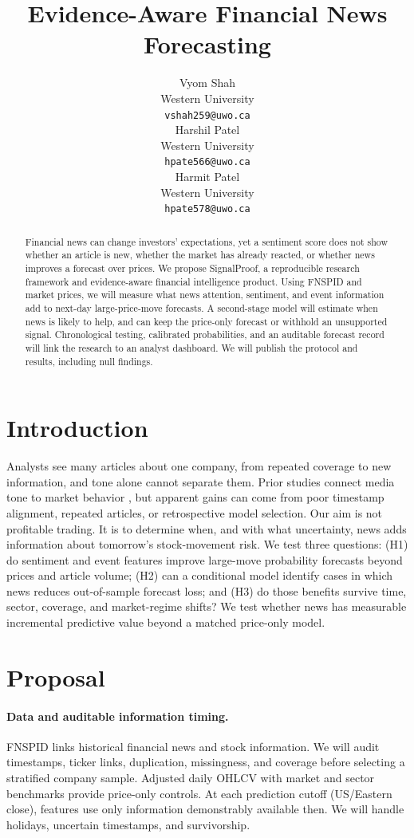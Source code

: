 \documentclass{article}
\title{Evidence-Aware Financial News Forecasting}
\author{%
  Vyom Shah \\
  Western University \\
  \texttt{vshah259@uwo.ca} \\
  \And
  Harshil Patel \\
  Western University \\
  \texttt{hpate566@uwo.ca} \\
  \And
  Harmit Patel \\
  Western University \\
  \texttt{hpate578@uwo.ca} \\
}
\begin{document}
\maketitle

\begin{abstract}
Financial news can change investors' expectations, yet a sentiment score does not show whether an article is new, whether the market has already reacted, or whether news improves a forecast over prices. We propose SignalProof, a reproducible research framework and evidence-aware financial intelligence product. Using FNSPID and market prices, we will measure what news attention, sentiment, and event information add to next-day large-price-move forecasts. A second-stage model will estimate when news is likely to help, and can keep the price-only forecast or withhold an unsupported signal. Chronological testing, calibrated probabilities, and an auditable forecast record will link the research to an analyst dashboard. We will publish the protocol and results, including null findings.
\end{abstract}

\section{Introduction}
Analysts see many articles about one company, from repeated coverage to new information, and tone alone cannot separate them. Prior studies connect media tone to market behavior \citep{tetlock2007}, but apparent gains can come from poor timestamp alignment, repeated articles, or retrospective model selection. Our aim is not profitable trading. It is to determine when, and with what uncertainty, news adds information about tomorrow's stock-movement risk. We test three questions: (H1) do sentiment and event features improve large-move probability forecasts beyond prices and article volume; (H2) can a conditional model identify cases in which news reduces out-of-sample forecast loss; and (H3) do those benefits survive time, sector, coverage, and market-regime shifts? We test whether news has measurable incremental predictive value beyond a matched price-only model.

\section{Proposal}
\paragraph{Data and auditable information timing.} FNSPID \citep{dong2024} links historical financial news and stock information. We will audit timestamps, ticker links, duplication, missingness, and coverage before selecting a stratified company sample. Adjusted daily OHLCV with market and sector benchmarks provide price-only controls. At each prediction cutoff (US/Eastern close), features use only information demonstrably available then. We will handle holidays, uncertain timestamps, and survivorship.
\end{document}
